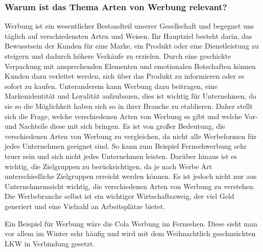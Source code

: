 \begin{refsection}
  
  \subsubsection*{Warum ist das Thema Arten von Werbung relevant?}
  Werbung ist ein wesentlicher Bestandteil unserer Gesellschaft und begegnet uns täglich auf verschiedensten Arten und Weisen. Ihr Hauptziel besteht darin, das Bewusstsein der Kunden für eine Marke, ein Produkt oder eine Dienstleistung zu steigern und dadurch höhere Verkäufe zu erzielen. Durch eine geschickte Verpackung mit ansprechenden Elementen und emotionalen Botschaften können Kunden dazu verleitet werden, sich über das Produkt zu informieren oder es sofort zu kaufen. Unteranderem kann Werbung dazu beitragen, eine Markenidentität und Loyalität aufzubauen, dies ist wichtig für Unternehmen, da sie so die Möglichkeit haben sich so in ihrer Branche zu etablieren. Daher stellt sich die Frage, welche verschiedenen Arten von Werbung es gibt und welche Vor- und Nachteile diese mit sich bringen. Es ist von gro\ss{}er Bedeutung, die verschiedenen Arten von Werbung zu vergleichen, da nicht alle Werbeformen für jedes Unternehmen geeignet sind. So kann zum Beispiel Fernsehwerbung sehr teuer sein und sich nicht jedes Unternehmen leisten. Darüber hinaus ist es wichtig, die Zielgruppen zu berücksichtigen, da je nach Werbe Art unterschiedliche Zielgruppen erreicht werden können. Es ist jedoch nicht nur aus Unternehmenssicht wichtig, die verschiedenen Arten von Werbung zu verstehen. Die Werbebranche selbst ist ein wichtiger Wirtschaftszweig, der viel Geld generiert und eine Vielzahl an Arbeitsplätze bietet.

Ein Beispiel für Werbung wäre die Cola Werbung im Fernsehen. Diese sieht man vor allem im Winter sehr häufig und wird mit dem Weihnachtlich geschmückten LKW in Verbindung gesetzt. \autocite{coca2021}
  \clearpage
  \printbibliography[heading=subsubbibliography]
\end{refsection}
\clearpage
